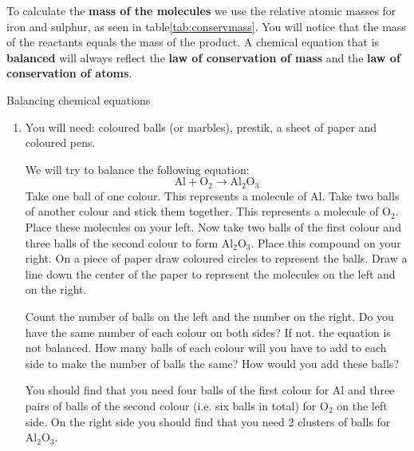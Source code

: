To calculate the \textbf{mass of the molecules} we use the relative atomic masses for iron and sulphur, as seen in table\ref{tab:conservmass}. You will notice that the mass of the reactants equals the mass of the product. A chemical equation that is \textbf{balanced} will always reflect the \textbf{law of conservation of mass} and the \textbf{law of conservation of atoms}.  
      \label{m38726*eip-619}
            \begin{activity}{Balancing chemical equations}
            \nopagebreak
\begin{enumerate}[noitemsep, label=\textbf{\arabic*}]
\item            \label{m38726*eip-695}You will need: coloured balls (or marbles), prestik, a sheet of paper and coloured pens.
\par 
\label{m38726*eip-69823}We will try to balance the following equation:
\label{m38726*eid0342}\nopagebreak\noindent{}
    \begin{equation*}
    \text{Al}+{\text{O}}_{2}\to {\text{Al}}_{2}{\text{O}}_{3}
      \end{equation*}
Take one ball of one colour. This represents a molecule of $\text{Al}$. Take two balls of another colour and stick them together. This represents a molecule of ${\text{O}}_{2}$. Place these molecules on your left. Now take two balls of the first colour and three balls of the second colour to form ${\text{Al}}_{2}{\text{O}}_{3}$. Place this compound on your right. On a piece of paper draw coloured circles to represent the balls. Draw a line down the center of the paper to represent the molecules on the left and on the right. 
\par 
\label{m38726*id23534}
Count the number of balls on the left and the number on the right. Do you have the same number of each colour on both sides? If not. the equation is not balanced. How many balls of each colour will you have to add to each side to make the number of balls the same? How would you add these balls?
\par
\label{m38726*id09873432}You should find that you need four balls of the first colour for $\text{Al}$ and three pairs of balls of the second colour (i.e. six balls in total) for ${\text{O}}_{2}$ on the left side. On the right side you should find that you need 2 clusters of balls for ${\text{Al}}_{2}{\text{O}}_{3}$.

\end{enumerate}
\end{activity}
